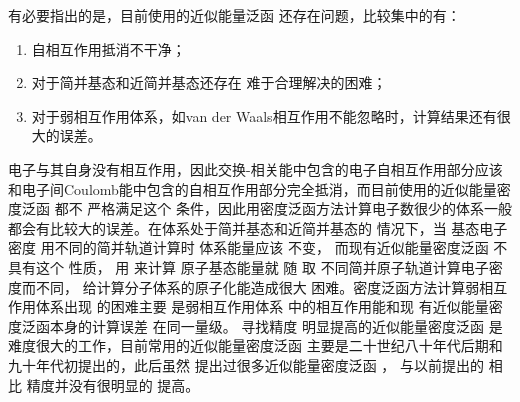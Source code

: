有必要指出的是，目前使用的{近似能量}泛函%
还存在问题，比较集中的有：
\begin{enumerate}
	\item 自相互作用抵消不干净；
	\item 对于简并基态和近简并基态还存在%
{难于合理解决的困难}；
	\item 对于弱相互作用体系，如van der Waals相互作用不能忽略时，{计算结果}还有很大的误差。%
\end{enumerate}
电子与{其}自身没有相互作用，因此交换-相关能中包含的电子自相互作用部分应该和电子间Coulomb能中包含的自相互作用部分完全抵消，而目前使用的{近似能量密度}泛函%
都不%
{严格满足}这个%
{条件}，因此{用}密度泛函方法计算电子数很少的体系一般都会有比较大的误差。{在体系处于}简并基态和近简并基态的%
{情况下}，当%
基态电子密度%
{用}不同的简并轨道{计算}时%
体系能量应该%
{不变}，%
{而现有近似能量密度}泛函%
不具有这个%
{性质}，%
用%
{来}计算%
原子基态能量就%
随%
取%
不同简并原子轨道{计算电子密度}而不同，%
给计算分子体系的原子化能造成很大%
困难。密度泛函方法计算弱相互作用体系出现%
的{困难}主要%
是弱相互作用体系%
{中的相互作用}能和现%
{有近似能量密度泛函}本身的{计算}误差%
{在同一量级}。%
寻找精度%
明显提高的近似能量密度泛函%
是难度很大的工作，目前常用的{近似能量密度}泛函%
主要是二十世纪八十年代后期和九十年代初提出的，此后虽然%
{提出过很多}近似{能量密度}泛函%
，%
与以前提出的%
相比%
{精度并}没有很明显的%
{提高}。

